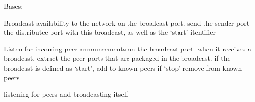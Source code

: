 \documentclass[letterpaper,10pt,english,openany,oneside]{sphinxmanual}
\begin{document}
\begin{fulllineitems}
\label{\detokenize{index:discovery.PeerDiscovery}}
\pysigstartsignatures
\pysiglinewithargsret
{}
{\sphinxparamcomma {}}
{}
\pysigstopsignatures
\sphinxAtStartPar
Bases: 

\begin{fulllineitems}
\label{\detokenize{index:discovery.PeerDiscovery.broadcast_announcement}}
\pysigstartsignatures
\pysiglinewithargsret
{}
{}
{}
\pysigstopsignatures
\sphinxAtStartPar
Broadcast availability to the network on the broadcast port. send the sender port
the distributee port with this broadcast, as well as the ‘start’ itentifier

\end{fulllineitems}


\begin{fulllineitems}
\label{\detokenize{index:discovery.PeerDiscovery.listen_for_peers}}
\pysigstartsignatures
\pysiglinewithargsret
{}
{}
{}
\pysigstopsignatures
\sphinxAtStartPar
Listen for incoming peer announcements on the broadcast port. when it receives a
broadcast, extract the peer ports that are packaged in the broadcast. if the broadcast
is defined as ‘start’, add to known peers \sphinxhyphen{} if ‘stop’ remove from known peers

\end{fulllineitems}


\begin{fulllineitems}
\label{\detokenize{index:discovery.PeerDiscovery.start}}
\pysigstartsignatures
\pysiglinewithargsret
{}
{}
{}
\pysigstopsignatures
\sphinxAtStartPar
listening for peers and broadcasting itself


\end{fulllineitems}
\end{fulllineitems}
\end{document}
